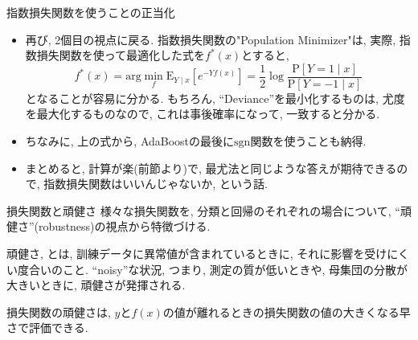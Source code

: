\documentclass[dvipdfmx,8pt]{beamer}
\begin{document}
  \begin{frame}{指数損失関数を使うことの正当化}
    \begin{itemize}
      \item 再び, 2個目の視点に戻る. 指数損失関数の"Population Minimizer"は,
      実際, 指数損失関数を使って最適化した式を$f^{*}(x)$とすると,
      \[
        f^{*}(x)=\mathrm{arg}\min_{f}\mathrm{E}_{Y \mid x}[e^{-Yf(x)}]=\frac{1}{2}\log\frac{\mathrm{P}[Y=1\mid x]}{\mathrm{P}[Y=-1\mid x]}
      \]
      となることが容易に分かる. もちろん, ``Deviance''を最小化するものは, 尤度を最大化するものなので, これは事後確率になって, 一致すると分かる.
      \item ちなみに, 上の式から, AdaBoostの最後に$\mathrm{sgn}$関数を使うことも納得.
      \item まとめると, 計算が楽(前節より)で, 最尤法と同じような答えが期待できるので, 指数損失関数はいいんじゃないか, という話.
    \end{itemize}
  \end{frame}
  \begin{frame}{損失関数と頑健さ}
    様々な損失関数を, 分類と回帰のそれぞれの場合について, ``頑健さ''(robustness)の視点から特徴づける.

    頑健さ, とは, 訓練データに異常値が含まれているときに, それに影響を受けにくい度合いのこと.
    ``noisy''な状況, つまり, 測定の質が低いときや, 母集団の分散が大きいときに, 頑健さが発揮される.

    損失関数の頑健さは, $y$と$f(x)$の値が離れるときの損失関数の値の大きくなる早さで評価できる.
  \end{frame}
\end{document}
